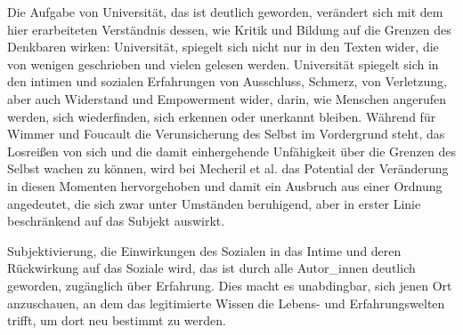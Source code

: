 Die Aufgabe von Universität, das ist deutlich geworden, verändert sich mit dem
hier erarbeiteten Verständnis dessen, wie Kritik und Bildung auf die Grenzen
des Denkbaren wirken: Universität, spiegelt sich nicht nur in den Texten wider,
die von wenigen geschrieben und vielen gelesen werden. Universität spiegelt
sich in den intimen und sozialen Erfahrungen von Ausschluss, Schmerz, von
Verletzung, aber auch Widerstand und Empowerment wider, darin, wie Menschen
angerufen werden, sich wiederfinden, sich erkennen oder unerkannt bleiben.
Während für Wimmer und Foucault die Verunsicherung des Selbst im Vordergrund
steht, das Losreißen von sich und die damit einhergehende Unfähigkeit über die
Grenzen des Selbst wachen zu können, wird bei Mecheril et al. das Potential der
Veränderung in diesen Momenten hervorgehoben und damit ein Ausbruch aus einer
Ordnung angedeutet, die sich zwar unter Umständen beruhigend, aber in erster
Linie beschränkend auf das Subjekt auswirkt. 

Subjektivierung, die Einwirkungen
des Sozialen in das Intime und deren Rückwirkung auf das Soziale wird, das ist
durch alle Autor\_innen deutlich geworden, zugänglich über Erfahrung. Dies macht
es unabdingbar, sich jenen Ort anzuschauen, an dem das legitimierte Wissen die
Lebens- und Erfahrungswelten trifft, um dort neu bestimmt zu werden.
